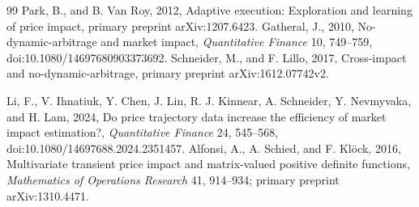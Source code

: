 \documentclass[12pt]{article}
\theoremstyle{definition}
\theoremstyle{remark}
\begin{document}
\begin{thebibliography}{99}
Park, B., and B. Van Roy, 2012, Adaptive execution: Exploration and learning of price impact, primary preprint arXiv:1207.6423.
Gatheral, J., 2010, No-dynamic-arbitrage and market impact, \emph{Quantitative Finance} 10, 749--759, doi:10.1080/14697680903373692.
Schneider, M., and F. Lillo, 2017, Cross-impact and no-dynamic-arbitrage, primary preprint arXiv:1612.07742v2.

Li, F., V. Ihnatiuk, Y. Chen, J. Lin, R. J. Kinnear, A. Schneider, Y. Nevmyvaka, and H. Lam, 2024, Do price trajectory data increase the efficiency of market impact estimation?, \emph{Quantitative Finance} 24, 545--568, doi:10.1080/14697688.2024.2351457.
Alfonsi, A., A. Schied, and F. Kl\"ock, 2016, Multivariate transient price impact and matrix-valued positive definite functions, \emph{Mathematics of Operations Research} 41, 914--934; primary preprint arXiv:1310.4471.

\end{thebibliography}
\end{document}
